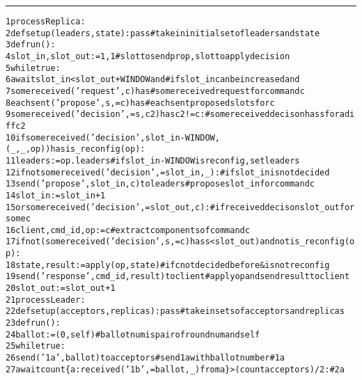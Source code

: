 \documentclass[11pt]{article}
\newenvironment{code}{\begin{alltt}\fontsize{8}{8}\selectfont}{\end{alltt}}
\begin{document}
\begin{figure*}[htb!] %
\begin{minipage}[c]{\arxiv{1.02}\ppdp{}\textwidth}
\rule{.99\columnwidth}{.1mm}
\begin{code}
\ppdp{} 1 process Replica:
\ppdp{} 2   def setup(leaders, state): pass                                 # take in initial set of leaders and state
\ppdp{} 3   def run():
\ppdp{} 4     slot_in, slot_out := 1, 1                                     # slot to send prop, slot to apply decision
\ppdp{} 5     while true:
\ppdp{} 6       await slot_in < slot_out + WINDOW and                       # if slot_in can be increased and
\ppdp{} 7             some received ('request',c) has                       # some received request for command c
\ppdp{} 8               each sent ('propose',s,=c) has                      # each sent proposed slot s for c
\ppdp{} 9                 some received ('decision',=s,c2) has c2 != c:     # some received decison has s for a diff c2
\ppdp{}10         if some received ('decision', slot_in - WINDOW, (_,_,op)) has is_reconfig(op):
\ppdp{}11           leaders := op.leaders                                   # if slot_in-WINDOW is reconfig, set leaders
\ppdp{}12         if not some received ('decision',=slot_in,_):             # if slot_in is not decided
\ppdp{}13           send ('propose', slot_in, c) to leaders                 #   propose slot_in for command c
\ppdp{}14         slot_in := slot_in + 1\medskip
\ppdp{}15       or some received ('decision', =slot_out, c):                # if received decison slot_out for some c
\ppdp{}16         client, cmd_id, op := c                                   # extract components of command c
\ppdp{}17         if not (some received ('decision',s,=c) has s < slot_out) and not is_reconfig(op):
\ppdp{}18           state, result := apply(op, state)                       # if c not decided before \& is not reconfig
\ppdp{}19           send ('response', cmd_id, result) to client             #   apply op and send result to client
\ppdp{}20         slot_out := slot_out + 1\medskip
\ppdp{}21 process Leader:
\ppdp{}22   def setup(acceptors, replicas): pass                            # take in sets of acceptors and replicas
\ppdp{}23   def run():
\ppdp{}24     ballot := (0, self)                                           # ballot num is pair of round num and self
\ppdp{}25     while true:
\ppdp{}26       send ('1a', ballot) to acceptors                            # send 1a with ballot number           # 1a\medskip
\ppdp{}27       await count \{a: received ('1b',=ballot,_) from a\} > (count acceptors)/2:                           # 2a

\end{code}
\end{minipage}
\end{figure*}
\end{document}
